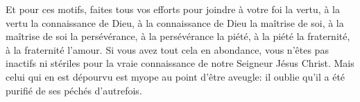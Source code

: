 Et pour ces motifs, faites tous vos efforts pour joindre à votre foi la vertu,
	à la vertu la connaissance de Dieu, à la connaissance de Dieu la maîtrise de soi,
	à la maîtrise de soi la persévérance, à la persévérance la piété,
	à la piété la fraternité, à la fraternité l’amour.
Si vous avez tout cela en abondance,
	vous n’êtes pas inactifs ni stériles
		pour la vraie connaissance de notre Seigneur Jésus Christ.
Mais celui qui en est dépourvu est myope au point d’être aveugle:
	il oublie qu’il a été purifié de ses péchés d’autrefois.

